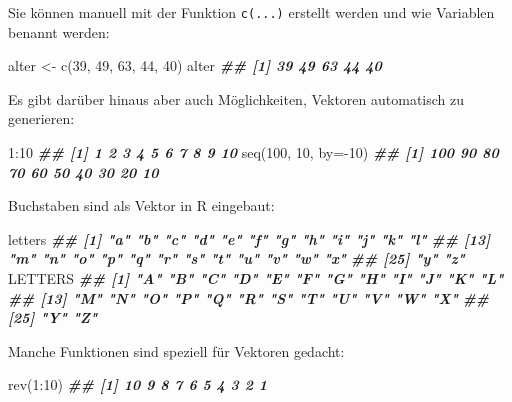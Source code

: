 \documentclass[11pt,german,a4paper]{article}
\newenvironment{Shaded}{\begin{snugshade}}{\end{snugshade}}
\newcommand{\AttributeTok}[1]{\textcolor[rgb]{0.77,0.63,0.00}{#1}}
\newcommand{\DecValTok}[1]{\textcolor[rgb]{0.00,0.00,0.81}{#1}}
\newcommand{\DocumentationTok}[1]{\textcolor[rgb]{0.56,0.35,0.01}{\textbf{\textit{#1}}}}
\newcommand{\FunctionTok}[1]{\textcolor[rgb]{0.00,0.00,0.00}{#1}}
\newcommand{\NormalTok}[1]{#1}
\newcommand{\OtherTok}[1]{\textcolor[rgb]{0.56,0.35,0.01}{#1}}
\newcommand{\SpecialCharTok}[1]{\textcolor[rgb]{0.00,0.00,0.00}{#1}}
\begin{document}
Sie können manuell mit der Funktion \texttt{c(...)} erstellt werden und wie Variablen benannt werden:

\begin{Shaded}
\begin{Highlighting}[]
\NormalTok{alter }\OtherTok{\textless{}{-}} \FunctionTok{c}\NormalTok{(}\DecValTok{39}\NormalTok{, }\DecValTok{49}\NormalTok{, }\DecValTok{63}\NormalTok{, }\DecValTok{44}\NormalTok{, }\DecValTok{40}\NormalTok{)}
\NormalTok{alter}
\DocumentationTok{\#\# [1] 39 49 63 44 40}
\end{Highlighting}
\end{Shaded}

Es gibt darüber hinaus aber auch Möglichkeiten, Vektoren automatisch zu generieren:

\begin{Shaded}
\begin{Highlighting}[]
\DecValTok{1}\SpecialCharTok{:}\DecValTok{10}
\DocumentationTok{\#\#  [1]  1  2  3  4  5  6  7  8  9 10}
\FunctionTok{seq}\NormalTok{(}\DecValTok{100}\NormalTok{, }\DecValTok{10}\NormalTok{, }\AttributeTok{by=}\SpecialCharTok{{-}}\DecValTok{10}\NormalTok{)}
\DocumentationTok{\#\#  [1] 100  90  80  70  60  50  40  30  20  10}
\end{Highlighting}
\end{Shaded}

Buchstaben sind als Vektor in R eingebaut:

\begin{Shaded}
\begin{Highlighting}[]
\NormalTok{letters}
\DocumentationTok{\#\#  [1] "a" "b" "c" "d" "e" "f" "g" "h" "i" "j" "k" "l"}
\DocumentationTok{\#\# [13] "m" "n" "o" "p" "q" "r" "s" "t" "u" "v" "w" "x"}
\DocumentationTok{\#\# [25] "y" "z"}
\NormalTok{LETTERS}
\DocumentationTok{\#\#  [1] "A" "B" "C" "D" "E" "F" "G" "H" "I" "J" "K" "L"}
\DocumentationTok{\#\# [13] "M" "N" "O" "P" "Q" "R" "S" "T" "U" "V" "W" "X"}
\DocumentationTok{\#\# [25] "Y" "Z"}
\end{Highlighting}
\end{Shaded}

Manche Funktionen sind speziell für Vektoren gedacht:

\begin{Shaded}
\begin{Highlighting}[]
\FunctionTok{rev}\NormalTok{(}\DecValTok{1}\SpecialCharTok{:}\DecValTok{10}\NormalTok{)}
\DocumentationTok{\#\#  [1] 10  9  8  7  6  5  4  3  2  1}
\end{Highlighting}
\end{Shaded}
\end{document}
